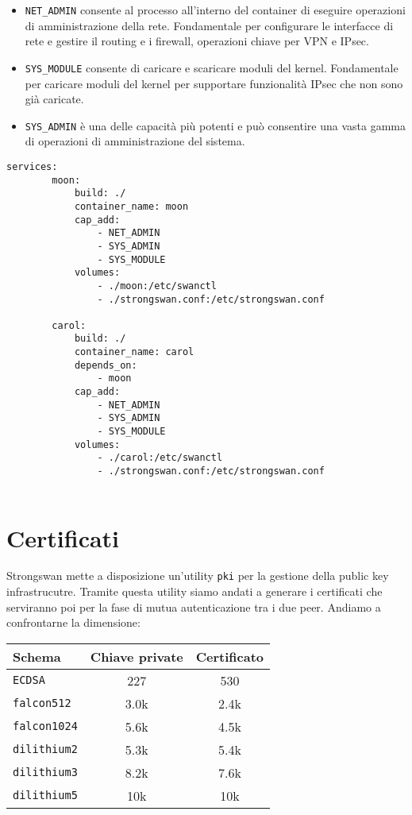 \begin{itemize}
    \item \texttt{NET\_ADMIN} consente al processo all'interno del
    container di eseguire operazioni di amministrazione della rete. 
    Fondamentale per configurare le interfacce di rete e gestire il routing e i
    firewall, operazioni chiave per VPN e IPsec.
    \item \texttt{SYS\_MODULE} consente di caricare e scaricare moduli
    del kernel. Fonda\-mentale per caricare moduli del kernel per supportare 
    funzionalità IPsec che non sono già caricate.
    \item \texttt{SYS\_ADMIN} è una delle capacità più potenti e può
    consentire una vasta gamma di operazioni di amministrazione del sistema.

\end{itemize}

\begin{lstlisting}[style=yaml]
    services: 
        moon: 
            build: ./ 
            container_name: moon 
            cap_add: 
                - NET_ADMIN 
                - SYS_ADMIN 
                - SYS_MODULE 
            volumes: 
                - ./moon:/etc/swanctl 
                - ./strongswan.conf:/etc/strongswan.conf 
        
        carol: 
            build: ./ 
            container_name: carol 
            depends_on: 
                - moon 
            cap_add: 
                - NET_ADMIN 
                - SYS_ADMIN 
                - SYS_MODULE 
            volumes: 
                - ./carol:/etc/swanctl 
                - ./strongswan.conf:/etc/strongswan.conf 
    
\end{lstlisting}

\section{Certificati}

Strongswan mette a disposizione un'utility \texttt{pki} per la gestione della public key infrastrucutre.
Tramite questa utility siamo andati a generare i certificati che serviranno poi per la fase di
mutua autenticazione tra i due peer.
Andiamo a confrontarne la dimensione:
\begin{table}[h]
    \centering
    \begin{tabular}{lcc}
        \toprule
        \textbf{Schema} & \textbf{Chiave private} & \textbf{Certificato} \\
        \midrule
        \texttt{ECDSA} & 227 & 530 \\
        \texttt{falcon512} & 3.0k & 2.4k\\
        \texttt{falcon1024} & 5.6k & 4.5k\\
        \texttt{dilithium2} & 5.3k & 5.4k\\
        \texttt{dilithium3} & 8.2k & 7.6k\\
        \texttt{dilithium5} & 10k & 10k\\
    \end{tabular}
\end{table}
    
